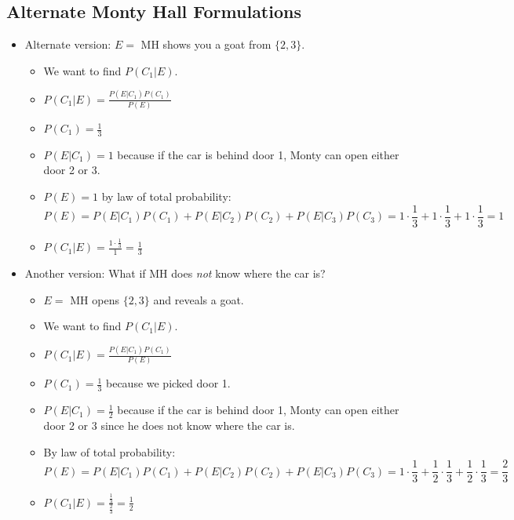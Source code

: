 \subsection{Alternate Monty Hall Formulations}

\begin{itemize}
      \item Alternate version: $E =$ MH shows you a goat from $\{ 2, 3 \}$.
            \begin{itemize}
                  \item We want to find $P(C_1 | E)$.
                  \item $P(C_1 | E) = \frac{P(E | C_1) P(C_1)}{P(E)}$
                  \item $P(C_1) = \frac{1}{3}$
                  \item $P(E | C_1) = 1$ because if the car is behind door 1, Monty can open either door 2 or 3.
                  \item $P(E) = 1$ by law of total probability:
                        \[ P(E) = P(E | C_1) P(C_1) + P(E | C_2) P(C_2) + P(E | C_3) P(C_3) = 1 \cdot \frac{1}{3} + 1 \cdot \frac{1}{3} + 1 \cdot \frac{1}{3} = 1 \]
                  \item $P(C_1 | E) = \frac{1 \cdot \frac{1}{3}}{1} = \frac{1}{3}$
            \end{itemize}

      \item Another version: What if MH does \textit{not} know where the car is?
            \begin{itemize}
                  \item $E =$ MH opens $\{2,3\}$ and reveals a goat.
                  \item We want to find $P(C_1 | E)$.
                  \item $P(C_1 | E) = \frac{P(E | C_1) P(C_1)}{P(E)}$
                  \item $P(C_1) = \frac{1}{3}$ because we picked door 1.
                  \item $P(E | C_1) = \frac{1}{2}$ because if the car is behind door 1, Monty can open either door 2 or 3 since he does not know where the car is.
                  \item By law of total probability:
                        \[ P(E) = P(E | C_1) P(C_1) + P(E | C_2) P(C_2) + P(E | C_3) P(C_3) = 1 \cdot \frac{1}{3} + \frac{1}{2} \cdot \frac{1}{3} + \frac{1}{2}\cdot \frac{1}{3} = \frac{2}{3} \]
                  \item $P(C_1 | E) = \frac{\frac{1}{3}}{\frac{2}{3}} = \frac{1}{2}$
            \end{itemize}
\end{itemize}

